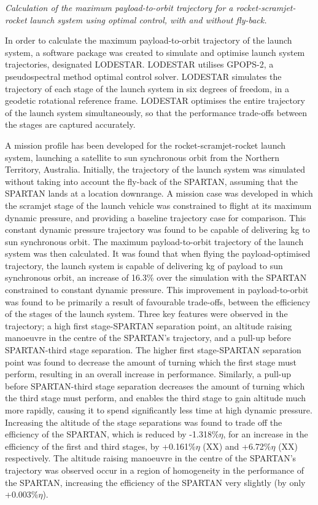 	
\emph{Calculation of the maximum payload-to-orbit trajectory for a rocket-scramjet-rocket launch system using optimal control, with and without fly-back.}

In order to calculate the maximum payload-to-orbit trajectory of the launch system, a software package was created to simulate and optimise launch system trajectories, designated LODESTAR. LODESTAR utilises GPOPS-2, a pseudospectral method optimal control solver. LODESTAR simulates the trajectory of each stage of the launch system in six degrees of freedom, in a geodetic rotational reference frame. 
LODESTAR optimises the entire trajectory of the launch system simultaneously, so that the performance trade-offs between the stages are captured accurately.

A mission profile has been developed for the rocket-scramjet-rocket launch system, launching a satellite to sun synchronous orbit from the Northern Territory, Australia. 
Initially, the trajectory of the launch system was simulated without taking into account the fly-back of the SPARTAN, assuming that the SPARTAN lands at a location downrange.
A mission case was developed in which the scramjet stage of the launch vehicle was constrained to flight at its maximum dynamic pressure, and providing a baseline trajectory case for comparison. This constant dynamic pressure trajectory was found to be capable of delivering \PayloadToOrbitConstq kg to sun synchronous orbit. 
The maximum payload-to-orbit trajectory of the launch system was then calculated. It was found that when flying the payload-optimised trajectory, the launch system is capable of delivering \PayloadToOrbitStandardNoReturn kg of payload to sun synchronous orbit, an increase of 16.3\% over the simulation with the SPARTAN constrained to constant dynamic pressure. 
This improvement in payload-to-orbit was found to be primarily a result of favourable trade-offs, between the efficiency of the stages of the launch system.
Three key features were observed in the trajectory; a high first stage-SPARTAN separation point, an altitude raising manoeuvre in the centre of the SPARTAN's trajectory, and a pull-up before SPARTAN-third stage separation. 
The higher first stage-SPARTAN separation point was found to decrease the amount of turning which the first stage must perform, resulting in an overall increase in performance. Similarly, a pull-up before SPARTAN-third stage separation decreases the amount of turning which the third stage must perform, and enables the third stage to gain altitude much more rapidly, causing it to spend significantly less time at high dynamic pressure. 
 Increasing the altitude of the stage separations was found to trade off the efficiency of the SPARTAN, which is reduced by -1.318\%$\eta$, for an increase in the efficiency of the first and third stages, by +0.161\%$\eta$ (XX) and +6.72\%$\eta$ (XX) respectively.
The altitude raising manoeuvre in the centre of the SPARTAN's trajectory was observed occur in a region of homogeneity in the performance of the SPARTAN, increasing the efficiency of the SPARTAN very slightly (by only +0.003\%$\eta$).

